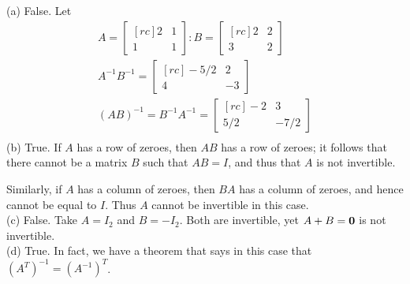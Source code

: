 \begin{solution}\noindent
(a) False. Let
\begin{eqnarray*}
A = 
\begin{bmatrix}[rc]
2&1\\
1&1
\end{bmatrix}:
B = 
\begin{bmatrix}[rc]
2&2\\
3&2
\end{bmatrix}\\
A^{-1}B^{-1} = 
\begin{bmatrix}[rc]
-5/2&2\\
4&-3
\end{bmatrix}\\
(AB)^{-1} = B^{-1}A^{-1} = 
\begin{bmatrix}[rc]
-2&3\\
5/2&-7/2
\end{bmatrix}\\
\end{eqnarray*}
\noindent (b) True. If $A$ has a row of zeroes, then $AB$ has a row of zeroes; it follows that there cannot be a matrix $B$ such that $AB=I$, and thus that $A$ is not invertible. 

Similarly, if $A$ has a column of zeroes, then $BA$ has a column of zeroes, and hence cannot be equal to $I$. Thus $A$ cannot be invertible in this case. 
\\
(c) 
False. Take $A=I_2$ and $B=-I_2$. Both are invertible, yet $A+B={\mathbf 0}$ is not invertible. 
\\
(d) True. In fact, we have a theorem that says in this case that $(A^T)^{-1}=(A^{-1})^T$. 
\end{solution}

\ee
